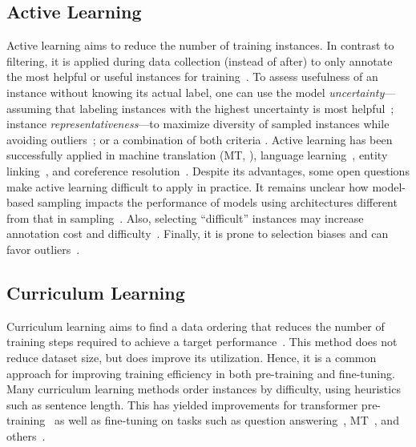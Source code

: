 \subsection{Active Learning} Active learning aims to reduce the number of training instances. In contrast to filtering, it is applied during data collection (instead of after) to only annotate the most helpful or useful instances for training~\citep{Settles2012,10.1145/3472291}. To assess usefulness of an instance without knowing its actual label, one can use the model \textit{uncertainty}---assuming that labeling instances with the highest uncertainty is most helpful~\citep{lewis1994sequential,tang-etal-2002-active,gal2017deep,yuan-etal-2020-cold}; instance \textit{representativeness}---to maximize diversity of sampled instances while avoiding outliers~\citep{bodo2011active,sener2018active,gissin2019discriminative}; or a combination of both criteria \citep{kirsch2019batchbald, Ash2020Deep, margatina-etal-2021-active,Shoaib2022,Agarwal_2022_CVPR}. Active learning has been successfully applied in machine translation (MT, \citealt{liu-etal-2018-learning}), language learning~\citep{lee-etal-2020-empowering}, entity linking~\citep{klie-etal-2020-zero}, and coreference resolution~\citep{li-etal-2020-active-learning,yuan-etal-2022-adapting}. Despite its advantages, some open questions make active learning difficult to apply in practice. It remains unclear how model-based sampling impacts the performance of models using architectures different from that in sampling~\citep{lowell-etal-2019-practical, ein-dor-etal-2020-active}. Also, selecting ``difficult'' instances may increase annotation cost and difficulty~\citep{settles2008active,lee-klie-gurevych-2022}. Finally, it is prone to selection biases and can favor outliers~\citep{cortes2008sampling-bias, karamcheti-etal-2021-mind}.

\subsection{Curriculum Learning}\label{sec:curriculum}
Curriculum learning aims to find a data ordering that reduces the number of training steps required to achieve a target performance~\citep{elman1993learning,Bengio2009}. This method does not reduce dataset size, but does improve its utilization. Hence, it is a common approach for improving training efficiency in both pre-training and fine-tuning. Many curriculum learning methods order instances by difficulty,  using heuristics such as sentence length. This has yielded improvements for transformer pre-training~\citep{press-etal-2021-shortformer,agrawal-etal-2021-role} as well as fine-tuning on tasks such as question answering~\cite{tay-etal-2019-simple}, MT~\citep{zhang-etal-2019-curriculum}, and others~\cite{xu-etal-2020-curriculum}.

